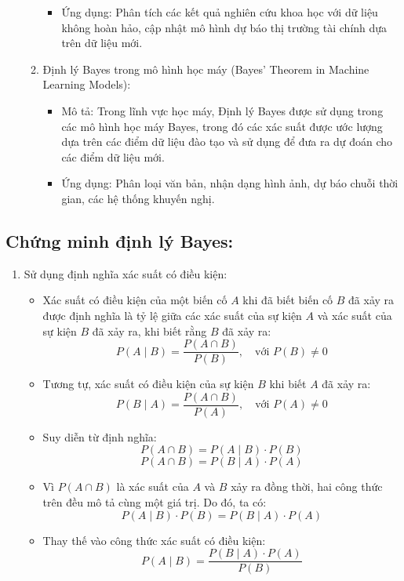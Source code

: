 \begin{itemize}
\begin{enumerate}
\begin{itemize}
            \item Ứng dụng: Phân tích các kết quả nghiên cứu khoa học với dữ liệu không hoàn hảo, cập nhật mô hình dự báo thị trường tài chính dựa trên dữ liệu mới.
        \end{itemize}
        \item Định lý Bayes trong mô hình học máy (Bayes' Theorem in Machine Learning Models):
        \begin{itemize}
            \item Mô tả: Trong lĩnh vực học máy, Định lý Bayes được sử dụng trong các mô hình học máy Bayes, trong đó các xác suất được ước lượng dựa trên các điểm dữ liệu đào tạo và sử dụng để đưa ra dự đoán cho các điểm dữ liệu mới.
            \item Ứng dụng: Phân loại văn bản, nhận dạng hình ảnh, dự báo chuỗi thời gian, các hệ thống khuyến nghị.
        \end{itemize}
    \end{enumerate}

\end{itemize}

\subsection{Chứng minh định lý Bayes:}

\begin{enumerate}
    \item Sử dụng định nghĩa xác suất có điều kiện:
    \begin{itemize}
        \item Xác suất có điều kiện của một biến cố \(A\) khi đã biết biến cố \(B\) đã xảy ra được định nghĩa là tỷ lệ giữa các xác suất của sự kiện \(A\) và xác suất của sự kiện \(B\) đã xảy ra, khi biết rằng \(B\) đã xảy ra:
\[P(A \mid B) = \frac{P(A \cap B)}{P(B)}, \quad \text{với } P(B) \neq 0\]
        \item Tương tự, xác suất có điều kiện của sự kiện \(B\) khi biết \(A\) đã xảy ra:
\[P(B \mid A) = \frac{P(A \cap B)}{P(A)}, \quad \text{với } P(A) \neq 0\]
        \item Suy diễn từ định nghĩa:
\[P(A \cap B) = P(A \mid B) \cdot P(B)\]
\[P(A \cap B) = P(B \mid A) \cdot P(A)\]
        \item Vì \(P(A \cap B)\) là xác suất của \(A\) và \(B\) xảy ra đồng thời, hai công thức trên đều mô tả cùng một giá trị. Do đó, ta có:
\[P(A \mid B) \cdot P(B) = P(B \mid A) \cdot P(A)\]
        \item Thay thế vào công thức xác suất có điều kiện:
\[P(A \mid B) = \frac{P(B \mid A) \cdot P(A)}{P(B)}\]       
    \end{itemize}

\end{enumerate}

